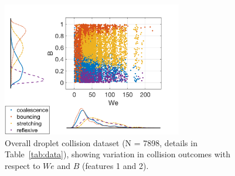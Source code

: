 \documentclass{article}
\begin{document}
\begin{figure}[h]
	\centering
	\includegraphics[width=0.7\textwidth]{figures/data_scatterhist.png}
	\caption{Overall droplet collision dataset (N = 7898, details in Table~\ref{tab:data}), showing variation in collision outcomes with respect to $We$ and $B$ (features 1 and 2).}
	\label{fig:data0}
\end{figure}
\end{document}
